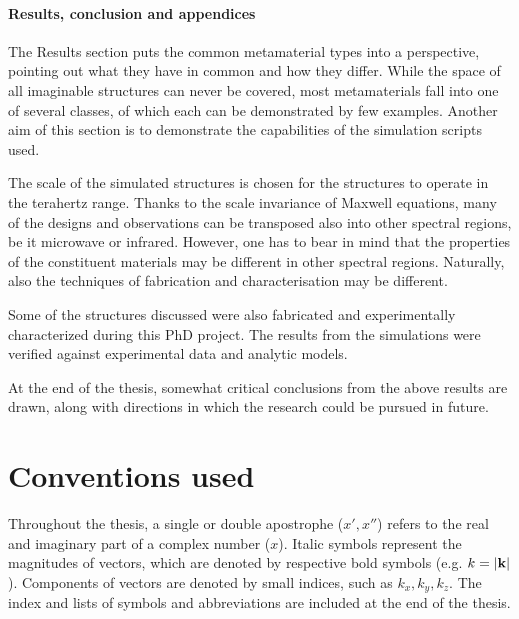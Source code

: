 \paragraph{Results, conclusion and appendices} %
The Results section puts the common metamaterial types into a perspective, pointing out what they have in common and how they differ.  %
While the space of all imaginable structures can never be covered, most metamaterials fall into one of several classes, of which each can be demonstrated by few examples. Another aim of this section is to demonstrate the capabilities of the simulation scripts used. 

The scale of the simulated structures is chosen for the structures to operate in the terahertz range. 
Thanks to the scale invariance of Maxwell equations, many of the designs and observations can be transposed also into other spectral regions, be it microwave or infrared. However, one has to bear in mind that the properties of the constituent materials may be different in other spectral regions. Naturally, also the techniques of fabrication and characterisation may be different.

Some of the structures discussed were also fabricated and experimentally characterized during this PhD project. 
The results from the simulations were verified against experimental data and analytic models.

At the end of the thesis, somewhat critical conclusions from the above results are drawn, along with directions in which the research could be pursued in future.


\section{Conventions used}%
Throughout the thesis, a single or double apostrophe ($x', x''$) refers to the real and imaginary part of a complex number ($x$). Italic symbols represent the magnitudes of vectors, which are denoted by respective bold symbols (e.g. $k = |{\mathbf{k}}|$). Components of vectors are denoted by small indices, such as $k_x, k_y, k_z$. 
The index and lists of symbols and abbreviations are included at the end of the thesis.

